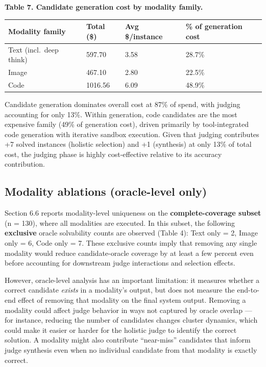 \documentclass[11pt]{article}
\begin{document}
\textbf{Table 7. Candidate generation cost by modality family.}

\begin{longtable}[]{@{}llll@{}}
\toprule\noalign{}
Modality family & Total (\$) & Avg \$/instance & \% of generation
cost \\
\midrule\noalign{}
\endhead
\bottomrule\noalign{}
\endlastfoot
Text (incl.~deep think) & 597.70 & 3.58 & 28.7\% \\
Image & 467.10 & 2.80 & 22.5\% \\
Code & 1016.56 & 6.09 & 48.9\% \\
\end{longtable}

Candidate generation dominates overall cost at 87\% of spend, with
judging accounting for only 13\%. Within generation, code candidates are
the most expensive family (49\% of generation cost), driven primarily by
tool-integrated code generation with iterative sandbox execution. Given
that judging contributes +7 solved instances (holistic selection) and +1
(synthesis) at only 13\% of total cost, the judging phase is highly
cost-effective relative to its accuracy contribution.

\hypertarget{modality-ablations-oracle-level-only}{%
\subsection{Modality ablations (oracle-level
only)}\label{modality-ablations-oracle-level-only}}

Section 6.6 reports modality-level uniqueness on the
\textbf{complete-coverage subset} (n = 130), where all modalities are
executed. In this subset, the following \textbf{exclusive} oracle
solvability counts are observed (Table 4): Text only = 2, Image only =
6, Code only = 7. These exclusive counts imply that removing any single
modality would reduce candidate-oracle coverage by at least a few
percent even before accounting for downstream judge interactions and
selection effects.

However, oracle-level analysis has an important limitation: it measures
whether a correct candidate \emph{exists} in a modality's output, but
does not measure the end-to-end effect of removing that modality on the
final system output. Removing a modality could affect judge behavior in
ways not captured by oracle overlap --- for instance, reducing the
number of candidates changes cluster dynamics, which could make it
easier or harder for the holistic judge to identify the correct
solution. A modality might also contribute ``near-miss'' candidates that
inform judge synthesis even when no individual candidate from that
modality is exactly correct.
\end{document}
